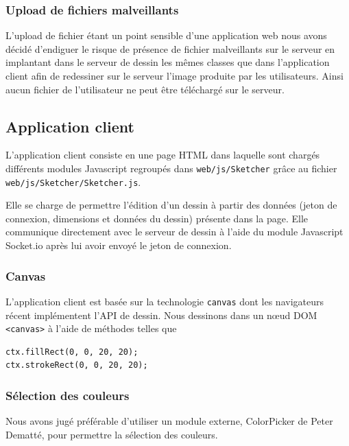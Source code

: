\documentclass[a4paper]{article}
\begin{document}
\subsubsection{Upload de fichiers malveillants}
L'upload de fichier étant un point sensible d'une application web nous avons décidé d'endiguer le risque de présence de fichier malveillants sur le serveur en implantant dans le serveur de dessin les mêmes classes que dans l'application client afin de redessiner sur le serveur l'image produite par les utilisateurs. Ainsi aucun fichier de l'utilisateur ne peut être téléchargé sur le serveur.

\subsection{Application client}
L'application client consiste en une page HTML dans laquelle sont chargés différents modules Javascript regroupés dans \texttt{web/js/Sketcher} grâce au fichier \texttt{web/js/Sketcher/Sketcher.js}.

Elle se charge de permettre l'édition d'un dessin à partir des données (jeton de connexion, dimensions et données du dessin) présente dans la page. Elle communique directement avec le serveur de dessin à l'aide du module Javascript Socket.io après lui avoir envoyé le jeton de connexion.

\subsubsection{Canvas}
L'application client est basée sur la technologie \texttt{canvas} dont les navigateurs récent implémentent l'API de dessin. Nous dessinons dans un nœud DOM \texttt{<canvas>} à l'aide de méthodes telles que
\begin{lstlisting}
ctx.fillRect(0, 0, 20, 20);
ctx.strokeRect(0, 0, 20, 20);
\end{lstlisting}

\subsubsection{Sélection des couleurs}
Nous avons jugé préférable d'utiliser un module externe, \cite{ColorPicker}ColorPicker de Peter Dematté, pour permettre la sélection des couleurs.
\end{document}
